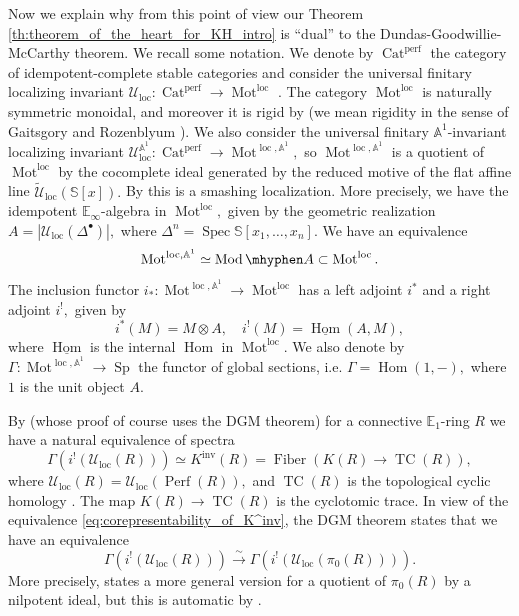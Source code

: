 \documentclass[11pt,leqno]{amsart}
\numberwithin{equation}{section}
\def\A{{\mathbb A}}
\def\bS{\mathbb{S}}
\def\wt{\widetilde}
\def\Hom{\operatorname{Hom}}
\newcommand{\hy}{\mhyphen}
\newcommand{\xto}{\xrightarrow}
\newcommand{\Mot}{\operatorname{Mot}}
\newcommand{\Cat}{\operatorname{Cat}}
\newcommand{\Fiber}{\operatorname{Fiber}}
\newcommand{\loc}{\operatorname{loc}}
\newcommand{\bE}{{\mathbb E}}
\newcommand{\cU}{{\mathcal U}}
\newcommand{\un}{\underline}
\newcommand{\TC}{\operatorname{TC}}
\newcommand{\Perf}{\operatorname{Perf}}
\newcommand{\perf}{\operatorname{perf}}
\newcommand{\Sp}{\operatorname{Sp}}
\newcommand{\Spec}{\operatorname{Spec}}
\newcommand{\Mod}{\operatorname{Mod}}
\newcommand{\inv}{\operatorname{inv}}
\begin{document}
Now we explain why from this point of view our Theorem \ref{th:theorem_of_the_heart_for_KH_intro} is ``dual'' to the Dundas-Goodwillie-McCarthy theorem. We recall some notation. We denote by $\Cat^{\perf}$ the category of idempotent-complete stable categories and consider the universal finitary localizing invariant $\cU_{\loc}:\Cat^{\perf}\to\Mot^{\loc}$ \cite{BGT, E25c}. The category $\Mot^{\loc}$ is naturally symmetric monoidal, and moreover it is rigid by \cite[Theorem 0.1]{E25c} (we mean rigidity in the sense of Gaitsgory and Rozenblyum \cite[Definition 9.12]{GaRo17}). We also consider the universal finitary $\A^1$-invariant localizing invariant $\cU_{\loc}^{\A^1}:\Cat^{\perf}\to\Mot^{\loc,\A^1},$ so $\Mot^{\loc,\A^1}$ is a quotient of $\Mot^{\loc}$ by the cocomplete ideal generated by the reduced motive of the flat affine line $\wt{\cU}_{\loc}(\bS[x]).$ By \cite[Theorem 8.1]{E25c} this is a smashing localization. More precisely, we have the idempotent $\bE_{\infty}$-algebra in $\Mot^{\loc},$ given by the geometric realization $A=|\cU_{\loc}(\Delta^{\bullet})|,$ where $\Delta^n=\Spec\bS[x_1,\dots,x_n].$ We have an equivalence 
\begin{equation*}
\Mot^{\loc,\A^1}\simeq\Mod\hy A\subset\Mot^{\loc}.
\end{equation*}
The inclusion functor $i_*:\Mot^{\loc,\A^1}\to\Mot^{\loc}$ has a left adjoint $i^*$ and a right adjoint $i^!,$ given by
\begin{equation*}
i^*(M)=M\otimes A,\quad i^!(M)=\un{\Hom}(A,M),
\end{equation*}
where $\un{\Hom}$ is the internal $\Hom$ in $\Mot^{\loc}.$ We also denote by $\Gamma:\Mot^{\loc,\A^1}\to\Sp$ the functor of global sections, i.e. $\Gamma=\Hom(1,-),$ where $1$ is the unit object $A.$

By \cite[Theorem 9.3]{E25c} (whose proof of course uses the DGM theorem) for a connective $\bE_1$-ring $R$ we have a natural equivalence of spectra
\begin{equation}\label{eq:corepresentability_of_K^inv}
\Gamma(i^!(\cU_{\loc}(R)))\simeq K^{\inv}(R) = \Fiber(K(R)\to \TC(R)),
\end{equation}
where $\cU_{\loc}(R)=\cU_{\loc}(\Perf(R)),$ and $\TC(R)$ is the topological cyclic homology \cite{BHM93, NS18}. The map $K(R)\to \TC(R)$ is the cyclotomic trace. In view of the equivalence \eqref{eq:corepresentability_of_K^inv}, the DGM theorem states that we have an equivalence
\begin{equation*}
\Gamma(i^!(\cU_{\loc}(R)))\xto{\sim} \Gamma(i^!(\cU_{\loc}(\pi_0(R)))).
\end{equation*}
More precisely, \cite[Theorem 7.0.0.2]{DGM13} states a more general version for a quotient of $\pi_0(R)$ by a nilpotent ideal, but this is automatic by \cite[Corollary 3.5]{LT19}.
\end{document}
